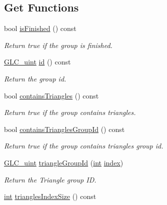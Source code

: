 \subsection*{Get Functions}
\begin{DoxyCompactItemize}
\item 
bool \hyperlink{class_g_l_c___primitive_group_a265b05cea5ce5445fd8006b011c3a618}{is\-Finished} () const 
\begin{DoxyCompactList}\small\item\em Return true if the group is finished. \end{DoxyCompactList}\item 
\hyperlink{glc__global_8h_abf950976fabed69026558df8e2da6c6b}{G\-L\-C\-\_\-uint} \hyperlink{class_g_l_c___primitive_group_aac64d06f025ce327bc39efd39f51abbe}{id} () const 
\begin{DoxyCompactList}\small\item\em Return the group id. \end{DoxyCompactList}\item 
bool \hyperlink{class_g_l_c___primitive_group_a4018576209cafd7ce06d1ee24cceece5}{contains\-Triangles} () const 
\begin{DoxyCompactList}\small\item\em Return true if the group contains triangles. \end{DoxyCompactList}\item 
bool \hyperlink{class_g_l_c___primitive_group_a4f67fa50465a902d82d4d224964d535e}{contains\-Triangles\-Group\-Id} () const 
\begin{DoxyCompactList}\small\item\em Return true if the group contains triangles group id. \end{DoxyCompactList}\item 
\hyperlink{glc__global_8h_abf950976fabed69026558df8e2da6c6b}{G\-L\-C\-\_\-uint} \hyperlink{class_g_l_c___primitive_group_a45714cc5c36c423febb4b269d97bf439}{triangle\-Group\-Id} (\hyperlink{ioapi_8h_a787fa3cf048117ba7123753c1e74fcd6}{int} \hyperlink{glext_8h_ab47dd9958bcadea08866b42bf358e95e}{index})
\begin{DoxyCompactList}\small\item\em Return the Triangle group I\-D. \end{DoxyCompactList}\item 
\hyperlink{ioapi_8h_a787fa3cf048117ba7123753c1e74fcd6}{int} \hyperlink{class_g_l_c___primitive_group_a107834b65daf69091655e4835a86acd5}{triangles\-Index\-Size} () const 

\end{DoxyCompactItemize}
